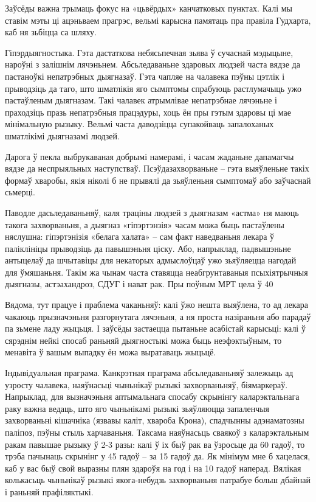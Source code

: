 Заўсёды важна трымаць фокус на «цьвёрдых» канчатковых пунктах. Калі мы ставім мэты ці ацэньваем прагрэс, вельмі карысна памятаць пра правіла Гудхарта, каб ня зьбіцца са шляху.

Гіпэрдыягностыка. Гэта дастаткова небясьпечная зьява ў сучаснай мэдыцыне, нароўні з залішнім лячэньнем. Абсьледаваньне здаровых людзей часта вядзе да пастаноўкі непатрэбных дыягназаў. Гэта чапляе на чалавека пэўны цэтлік і прыводзіць да таго, што шматлікія яго сымптомы спрабуюць растлумачыць ужо пастаўленым дыягназам. Такі чалавек атрымлівае непатрэбнае лячэньне і праходзіць празь непатрэбныя працэдуры, хоць ён пры гэтым здаровы ці мае мінімальную рызыку. Вельмі часта даводзіцца супакойваць запалоханых шматлікімі дыягназамі людзей.

Дарога ў пекла выбрукаваная добрымі намерамі, і часам жаданьне дапамагчы вядзе да неспрыяльных наступстваў. Псэўдазахворваньне – гэта выяўленьне такіх формаў хваробы, якія ніколі б не прывялі да зьяўленьня сымптомаў або заўчаснай сьмерці.

Паводле дасьледаваньняў, каля траціны людзей з дыягназам «астма» ня маюць такога захворваньня, а дыягназ «гіпэртэнзія» часам можа быць пастаўлены няслушна: гіпэртэнізія «белага халата» – сам факт наведваньня лекара ў паліклініцы прыводзіць да павышэньня ціску. Або, напрыклад, падвышэньне антыцелаў да шчытавіцы для некаторых адмыслоўцаў ужо зьяўляецца нагодай для ўмяшаньня. Такім жа чынам часта ставяцца неабгрунтаваныя псыхіятрычныя дыягназы, астэахандроз, СДУГ і нават рак. Пры поўным МРТ цела ў 40%

Вядома, тут працуе і праблема чаканьняў: калі ўжо нешта выяўлена, то ад лекара чакаюць прызначэньня разгорнутага лячэньня, а ня проста назіраньня або парадаў па зьмене ладу жыцьця. І заўсёды застаецца пытаньне асабістай карысьці: калі ў сярэднім нейкі спосаб раньняй дыягностыкі можа быць неэфэктыўным, то менавіта ў вашым выпадку ён можа выратаваць жыцьцё.

Індывідуальная праграма. Канкрэтная праграма абсьледаваньняў залежыць ад узросту чалавека, наяўнасьці чыньнікаў рызыкі захворваньняў, біямаркераў. Напрыклад, для вызначэньня аптымальнага спосабу скрынінгу каларэктальнага раку важна ведаць, што яго чыньнікамі рызыкі зьяўляюцца запаленчыя захворваньні кішачніка (язвавы каліт, хвароба Крона), спадчынны адэнаматозны паліпоз, пэўны стыль харчаваньня. Таксама наяўнасьць сваякоў з каларэктальным ракам павышае рызыку ў 2-3 разы: калі ў іх быў рак ва ўзросьце да 60 гадоў, то трэба пачынаць скрынінг у 45 гадоў – за 15 гадоў да. Як мінімум мне б хацелася, каб у вас быў свой выразны плян здароўя на год і на 10 гадоў наперад. Вялікая колькасьць чыньнікаў рызыкі якога-небудзь захворваньня патрабуе больш дбайнай і раньняй прафіляктыкі.

